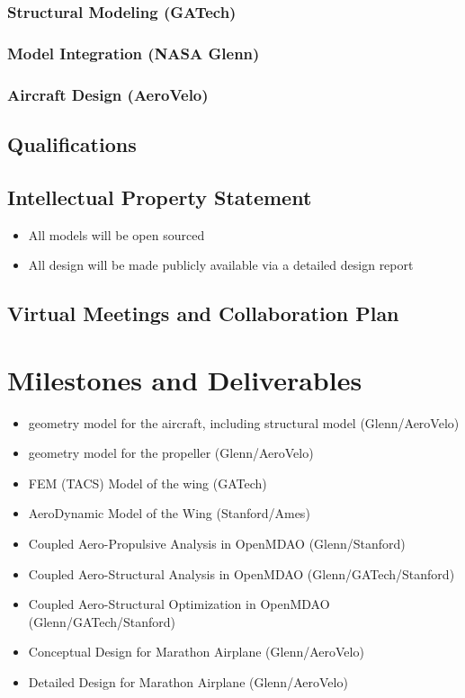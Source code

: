 \documentclass[]{report}
\begin{document}
        \subsubsection{Structural Modeling (GATech)}
        \subsubsection{Model Integration (NASA Glenn)}
        \subsubsection{Aircraft Design (AeroVelo)}

    \subsection{Qualifications}
    \subsection{Intellectual Property Statement}
        \begin{itemize}
            \item All models will be open sourced
            \item All design will be made publicly available via a detailed design report
        \end{itemize}

    \subsection{Virtual Meetings and Collaboration Plan}

\section{Milestones and Deliverables}

    \begin{itemize}
        \item geometry model for the aircraft, including structural model (Glenn/AeroVelo)
        \item geometry model for the propeller (Glenn/AeroVelo)
        \item FEM (TACS) Model of the wing (GATech)
        \item AeroDynamic Model of the Wing (Stanford/Ames)
        \item Coupled Aero-Propulsive Analysis in OpenMDAO (Glenn/Stanford)
        \item Coupled Aero-Structural Analysis in OpenMDAO (Glenn/GATech/Stanford)
        \item Coupled Aero-Structural Optimization in OpenMDAO (Glenn/GATech/Stanford)
        \item Conceptual Design for Marathon Airplane (Glenn/AeroVelo)
        \item Detailed Design for Marathon Airplane (Glenn/AeroVelo)
    \end{itemize}
\end{document}
